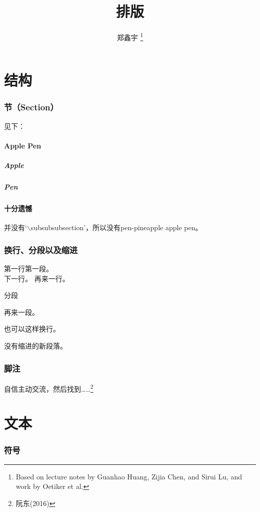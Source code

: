 \documentclass[12pt]{article}
\author{郑鑫宇 \thanks{Based on lecture notes by Guanhao Huang, Zijia Chen, and Sirui Lu, and work by Oetiker et{} al.}}
\title{排版}
\begin{document}
\maketitle
\newpage

\tableofcontents
\newpage

\part{结构}

\section{节（Section）}
见下：
\subsection{Apple Pen}
\subsubsection{Apple}
\subsubsection{Pen}
\subsection*{十分遗憾}
并没有`$\backslash$subsubsubsection'，所以没有pen-pineapple apple pen。

\section{换行、分段以及缩进}
第一行第一段。\\
下一行。\newline
\indent 再来一行。

分段\par
再来一段。

也可以这样换行。

\noindent 没有缩进的新段落。

\section{脚注}
自信主动交流，然后找到……\footnote{阮东(2016)}

\part{文本}
\section{符号}\label{sec1}
\end{document}
